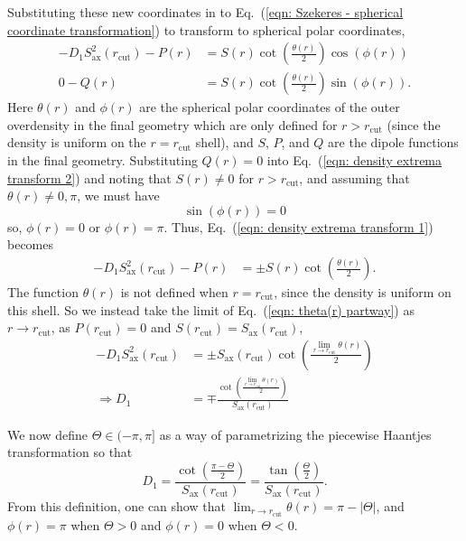 \documentclass[a4paper,12pt]{report}
\renewcommand{\eqref}[1]{Eq.~({#1})}
\begin{document}
\begin{appendices}
Substituting these new coordinates in to \eqref{\ref{eqn: Szekeres - spherical coordinate transformation}} to transform to spherical polar coordinates,
\begin{align}
    -D_1 S_\text{ax}^2 (r_\text{cut})-P(r) &= S(r) \cot \left(\frac{\theta(r)}{2}\right) \cos(\phi(r)) \label{eqn: density extrema transform 1}\\
    0-Q(r) &= S(r) \cot \left(\frac{\theta(r)}{2}\right) \sin(\phi(r)) \label{eqn: density extrema transform 2}.
\end{align}
Here $\theta(r)$ and $\phi(r)$ are the spherical polar coordinates of the outer overdensity in the final geometry which are only defined for $r>r_\text{cut}$ (since the density is uniform on the $r=r_\text{cut}$ shell), and $S$, $P$, and $Q$ are the dipole functions in the final geometry. Substituting $Q(r)=0$ into \eqref{\ref{eqn: density extrema transform 2}} and noting that $S(r) \neq 0$ for $r>r_\text{cut}$, and assuming that $\theta(r) \neq 0, \pi$, we must have
\begin{equation}
    \sin (\phi(r)) = 0
\end{equation}
so, $\phi(r) = 0$ or $\phi(r) = \pi$. Thus, \eqref{\ref{eqn: density extrema transform 1}} becomes
\begin{align}
    -D_1 S_\text{ax}^2 (r_\text{cut})-P(r) &= \pm S(r) \cot \left(\frac{\theta(r)}{2}\right) \label{eqn: theta(r) partway}.
\end{align}
The function $\theta(r)$ is not defined when $r=r_\text{cut}$, since the density is uniform on this shell. So we instead take the limit of \eqref{\ref{eqn: theta(r) partway}} as $r \to r_\text{cut}$, as $P(r_\text{cut})=0$ and $S(r_\text{cut})=S_\text{ax}(r_\text{cut})$,
\begin{align}
    -D_1 S_\text{ax}^2 (r_\text{cut}) &= \pm S_\text{ax}(r_\text{cut}) \cot \left(\frac{\lim_{r\to r_\text{cut}}\theta(r)}{2}\right) \\
    \Longrightarrow D_1 &= \mp \frac{\cot \left(\frac{\lim_{r\to r_\text{cut}}\theta(r)}{2}\right)}{S_\text{ax}(r_\text{cut})}
\end{align}

We now define $\Theta \in (-\pi, \pi]$ as a way of parametrizing the piecewise Haantjes transformation so that
\begin{equation}\label{eqn: Theta D_1 relation appendix}
    D_1 = \frac{\cot \left(\frac{\pi - \Theta}{2}\right)}{S_\text{ax} (r_\text{cut})} = \frac{\tan \left(\frac{\Theta}{2}\right)}{S_\text{ax} (r_\text{cut})}.
\end{equation}
From this definition, one can show that $\lim_{r\to r_\text{cut}}\theta(r) = \pi - |\Theta|$, and $\phi(r) = \pi$ when $\Theta>0$ and $\phi(r)=0$ when $\Theta<0$.


\end{appendices}
\end{document}

